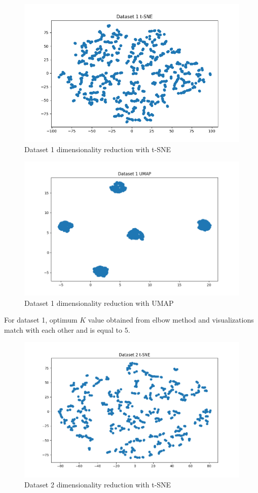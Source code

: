 \documentclass[12pt,a4paper, margin=1in]{article}
\begin{document}
\begin{figure}[H]
    \centering
    \includegraphics[scale=0.85]{dataset1_tsne.png}
    \caption{Dataset 1 dimensionality reduction with t-SNE}
\end{figure}

\begin{figure}[H]
    \centering
    \includegraphics[scale=0.85]{dataset1_umap.png}
    \caption{Dataset 1 dimensionality reduction with UMAP}
\end{figure}

For dataset 1, optimum $K$ value obtained from elbow method and visualizations match with each other and is equal to $5$.

\begin{figure}[H]
    \centering
    \includegraphics[scale=0.85]{dataset2_tsne.png}
    \caption{Dataset 2 dimensionality reduction with t-SNE}
\end{figure}
\end{document}
